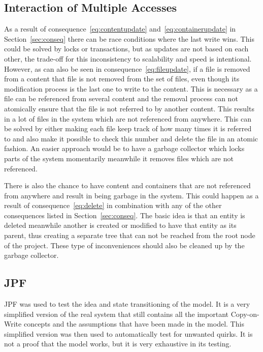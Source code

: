 \documentclass[a4paper,12pt]{article}
\newcommand{\Implies}{\Rightarrow}
\begin{document}

\subsection{Interaction of Multiple Accesses} \label{sec:multiple_access}
As a result of consequence~\ref{eq:contentupdate} and~\ref{eq:containerupdate} in
Section~\ref{sec:conseq} there can be race conditions where the last write wins. This could be
solved by locks or transactions, but as updates are not based on each other, the trade-off for this
inconsistency to scalability and speed is intentional. However, as can also be seen in
consequence~\ref{eq:fileupdate}, if a file is removed from a content that file is not removed from
the set of files, even though its modification process is the last one to write to the content.
This is necessary as a file can be referenced from several content and the removal process can not
atomically ensure that the file is not referred to by another content. This results in a lot of
files in the system which are not referenced from anywhere. This can be solved by either making each
file keep track of how many times it is referred to and also make it possible to check this number
and delete the file in an atomic fashion. An easier approach would be to have a garbage collector
which locks parts of the system momentarily meanwhile it removes files which are not referenced. 

\par
There is also the chance to have content and containers that are not referenced from anywhere and
result in being garbage in the system. This could happen as a result of consequence~\ref{eq:delete}
in combination with any of the other consequences listed in Section~\ref{sec:conseq}. The basic idea
is that an entity is deleted meanwhile another is created or modified to have that entity as its
parent, thus creating a separate tree that can not be reached from the root node of the project.
These type of inconveniences should also be cleaned up by the garbage collector.

\subsection{JPF}
JPF was used to test the idea and state transitioning of the model. It is a very simplified
version of the real system that still contains all the important Copy-on-Write concepts and the 
assumptions that have been made in the model. This simplified version was then used to automatically
test for unwanted quirks. It is not a proof that the model works, but it is very exhaustive in its
testing.
\end{document}
